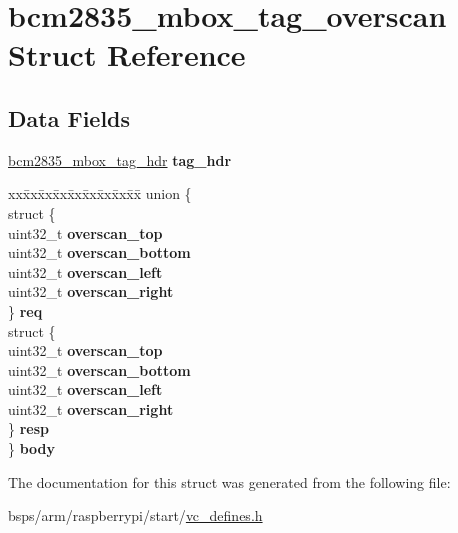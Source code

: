 \hypertarget{structbcm2835__mbox__tag__overscan}{}\section{bcm2835\+\_\+mbox\+\_\+tag\+\_\+overscan Struct Reference}
\label{structbcm2835__mbox__tag__overscan}
\subsection*{Data Fields}
\begin{DoxyCompactItemize}
\item 
\mbox{\label{structbcm2835__mbox__tag__overscan_ab3fc43fe31261a14cc3b7215cab38e9b}} 
\mbox{\hyperlink{structbcm2835__mbox__tag__hdr}{bcm2835\+\_\+mbox\+\_\+tag\+\_\+hdr}} {\bfseries tag\+\_\+hdr}
\item 
\mbox{\label{structbcm2835__mbox__tag__overscan_a43de9f414d6f7447402764230eba313a}} 
\begin{tabbing}
xx\=xx\=xx\=xx\=xx\=xx\=xx\=xx\=xx\=\kill
union \{\\
\>struct \{\\
\>\>uint32\_t {\bfseries overscan\_top}\\
\>\>uint32\_t {\bfseries overscan\_bottom}\\
\>\>uint32\_t {\bfseries overscan\_left}\\
\>\>uint32\_t {\bfseries overscan\_right}\\
\>\} {\bfseries req}\\
\>struct \{\\
\>\>uint32\_t {\bfseries overscan\_top}\\
\>\>uint32\_t {\bfseries overscan\_bottom}\\
\>\>uint32\_t {\bfseries overscan\_left}\\
\>\>uint32\_t {\bfseries overscan\_right}\\
\>\} {\bfseries resp}\\
\} {\bfseries body}\\

\end{tabbing}\end{DoxyCompactItemize}


The documentation for this struct was generated from the following file\+:\begin{DoxyCompactItemize}
\item 
bsps/arm/raspberrypi/start/\mbox{\hyperlink{vc__defines_8h}{vc\+\_\+defines.\+h}}\end{DoxyCompactItemize}
